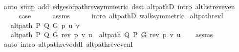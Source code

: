 \begin{isabellebody}
\ \ \ \ \isamarkupfalse%
\ {\isacharparenleft}{\kern0pt}auto\ simp\ add{\isacharcolon}{\kern0pt}\ edges{\isacharunderscore}{\kern0pt}of{\isacharunderscore}{\kern0pt}path{\isacharunderscore}{\kern0pt}rev{\isacharbrackleft}{\kern0pt}symmetric{\isacharbrackright}{\kern0pt}\ dest{\isacharcolon}{\kern0pt}\ alt{\isacharunderscore}{\kern0pt}pathD{\isacharparenleft}{\kern0pt}{}{\isacharparenright}{\kern0pt}\ intro{\isacharcolon}{\kern0pt}\ alt{\isacharunderscore}{\kern0pt}list{\isacharunderscore}{\kern0pt}rev{\isacharunderscore}{\kern0pt}even{\isacharparenright}{\kern0pt}\isanewline
{}\isamarkupfalse%
\isanewline
\ \ \isamarkupfalse%
\ {}\isanewline
\ \ \isamarkupfalse%
\ {\isacharquery}{\kern0pt}case\isanewline
\ \ \ \ \isamarkupfalse%
\ assms{\isacharparenleft}{\kern0pt}{}{\isacharparenright}{\kern0pt}\isanewline
\ \ \ \ \isamarkupfalse%
\ {\isacharparenleft}{\kern0pt}intro\ alt{\isacharunderscore}{\kern0pt}pathD{\isacharparenleft}{\kern0pt}{}{\isacharparenright}{\kern0pt}\ walk{\isacharunderscore}{\kern0pt}symmetric{\isacharparenright}{\kern0pt}\isanewline
{}\isamarkupfalse%
%
\endisatagproof
{\isafoldproof}%
%
\isadelimproof
\isanewline
%
\endisadelimproof
\isanewline
{}\isamarkupfalse%
\ alt{\isacharunderscore}{\kern0pt}path{\isacharunderscore}{\kern0pt}revI{\isacharcolon}{\kern0pt}\isanewline
\ \ \ {\isachardoublequoteopen}alt{\isacharunderscore}{\kern0pt}path\ P\ Q\ G\ p\ u\ v{\isachardoublequoteclose}\isanewline
\ \ \ {\isachardoublequoteopen}alt{\isacharunderscore}{\kern0pt}path\ P\ Q\ G\ {\isacharparenleft}{\kern0pt}rev\ p{\isacharparenright}{\kern0pt}\ v\ u\ {\isasymor}\ alt{\isacharunderscore}{\kern0pt}path\ Q\ P\ G\ {\isacharparenleft}{\kern0pt}rev\ p{\isacharparenright}{\kern0pt}\ v\ u{\isachardoublequoteclose}\isanewline
%
\isadelimproof
\ \ %
\endisadelimproof
%
\isatagproof
{}\isamarkupfalse%
\ assms\isanewline
\ \ \isamarkupfalse%
\ {\isacharparenleft}{\kern0pt}auto\ intro{\isacharcolon}{\kern0pt}\ alt{\isacharunderscore}{\kern0pt}path{\isacharunderscore}{\kern0pt}rev{\isacharunderscore}{\kern0pt}oddI\ alt{\isacharunderscore}{\kern0pt}path{\isacharunderscore}{\kern0pt}rev{\isacharunderscore}{\kern0pt}evenI{\isacharparenright}{\kern0pt}%
\endisatagproof
{\isafoldproof}%
%
\isadelimproof
%
\endisadelimproof
%
\isadeliminvisible
%
\endisadeliminvisible
%
\isataginvisible
%
\begin{isamarkuptext}%

\end{isamarkuptext}
\end{isabellebody}
